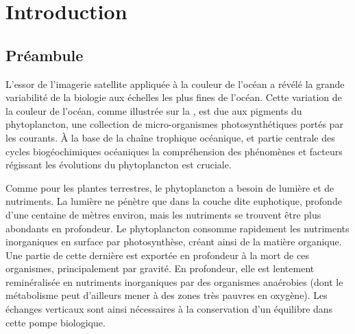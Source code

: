 
\chapter{Introduction}
\addChpLof
\label{chp:introduction}
\graphicspath{{resources/introduction}}

{
  \hypersetup{hidelinks}
  \minitoc%
  \clearpage
}

\begin{figure}[!h]
  \centering
  {%
    \setlength{\fboxsep}{0pt}%
  }%
  \label{fig:oc-illustration}
\end{figure}

\vspace{1\baselineskip}

\section{Préambule}

L'essor de l'imagerie satellite appliquée à la couleur de l'océan  a révélé la grande variabilité de la biologie aux échelles les plus fines de l'océan.
Cette variation de la couleur de l'océan, comme illustrée sur la , est due aux pigments du phytoplancton, une collection de micro-organismes photosynthétiques portés par les courants.
À la base de la chaîne trophique océanique, et partie centrale des cycles biogéochimiques océaniques  la compréhension des phénomènes et facteurs régissant les évolutions du phytoplancton est cruciale.

Comme pour les plantes terrestres, le phytoplancton a besoin de lumière et de nutriments.
La lumière ne pénètre que dans la couche dite euphotique, profonde d'une centaine de mètres environ, mais les nutriments se trouvent être plus abondants en profondeur.
Le phytoplancton consomme rapidement les nutriments inorganiques en surface par photosynthèse, créant ainsi de la matière organique.
Une partie de cette dernière est exportée en profondeur à la mort de ces organismes, principalement par gravité.
En profondeur, elle est lentement reminéralisée en nutriments inorganiques par des organismes anaérobies (dont le métabolisme peut d'ailleurs mener à des zones très pauvres en oxygène).
Les échanges verticaux  sont ainsi nécessaires à la conservation d'un équilibre dans cette pompe biologique.

